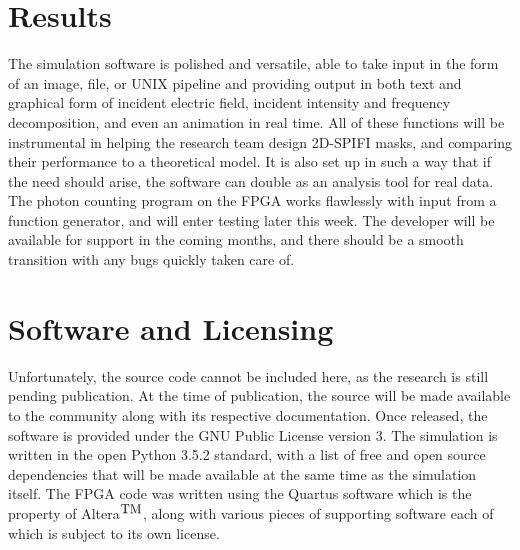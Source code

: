 \documentclass[12pt]{article}
\begin{document}
\section*{Results}
The simulation software is polished and versatile, able to take input in the form of an image, file, or UNIX pipeline and providing output in both text and graphical form of incident electric field, incident intensity and frequency decomposition, and even an animation in real time. All of these functions will be instrumental in helping the research team design 2D-SPIFI masks, and comparing their performance to a theoretical model. It is also set up in such a way that if the need should arise, the software can double as an analysis tool for real data. The photon counting program on the FPGA works flawlessly with input from a function generator, and will enter testing later this week. The developer will be available for support in the coming months, and there should be a smooth transition with any bugs quickly taken care of.


\section*{Software and Licensing}
Unfortunately, the source code cannot be included here, as the research is still pending publication. At the time of publication, the source will be made available to the community along with its respective documentation.
Once released, the software is provided under the GNU Public License version 3. The simulation is written in the open Python 3.5.2 standard, with a list of free and open source dependencies that will be made available at the same time as the simulation itself. The FPGA code was written using the Quartus software which is the property of Altera$^\textnormal{\small TM}$, along with various pieces of supporting software each of which is subject to its own license. 
\end{document}
